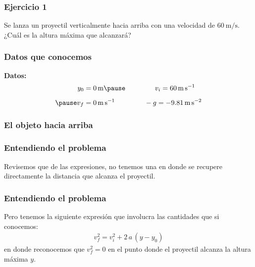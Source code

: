 \documentclass[14pt]{beamer}
\begin{document}
\begin{frame}
\frametitle{Ejercicio 1}
Se lanza un proyectil verticalmente hacia arriba con una velocidad de $\SI{60}{\meter\per\second}$.
\\
\bigskip
\pause
¿Cuál es la altura máxima que alcanzará?
\end{frame}
\begin{frame}
\frametitle{Datos que conocemos}
\textbf{Datos:}
\begin{eqnarray*}
\begin{aligned}
y_{0} &= \SI{0}{\meter} \pause \hspace{1.5cm} v_{i} = \SI{60}{\meter\per\second} \\[0.5em] \pause
v_{f} &= \SI{0}{\meter\per\second} \hspace{1.5cm} -g = -\SI{9.81}{\meter\per\square\second}
\end{aligned}
\end{eqnarray*}
\end{frame}
\begin{frame}
\frametitle{El objeto hacia arriba}
\begin{figure}
    \centering
\end{figure}
\end{frame}
\begin{frame}
\frametitle{Entendiendo el problema}
Revisemos que de las expresiones, no tenemos una en donde se recupere directamente la distancia que alcanza el proyectil.
\end{frame}
\begin{frame}
\frametitle{Entendiendo el problema}
Pero tenemos la siguiente expresión que involucra las cantidades que si conocemos:
\pause
\begin{align*}
v_{f}^{2} = v_{i}^{2} + 2 \, a \, (y - y_{0})
\end{align*}
\pause
en donde reconocemos que $v_{f}^{2} = 0$ en el punto donde el proyectil alcanza la altura máxima $y$.
\end{frame}
\end{document}
